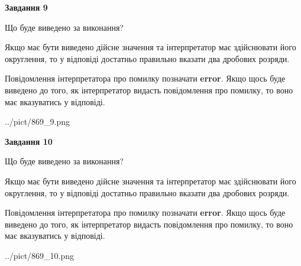 \documentclass[12pt, ukrainian]{article}
\begin{document}
{\begin {Large}
{\begin {center}\textbf{Завдання 9}\end {center}}\par
Що буде виведено за виконання? \par

Якщо має бути виведено дійсне значення та інтерпретатор має здійснювати його округлення, 
то у відповіді достатньо правильно вказати два дробових розряди.

Повідомлення інтерпретатора про помилку позначати \textbf{error}.
Якщо щось буде виведено до того, як інтерпретатор видасть повідомлення про помилку, 
то воно має вказуватись у відповіді. \par

\begin{center}
	{../pict/869_9.png}
\end{center}
\newpage

{\begin {center}\textbf{Завдання 10}\end {center}}\par
Що буде виведено за виконання? \par

Якщо має бути виведено дійсне значення та інтерпретатор має здійснювати його округлення, 
то у відповіді достатньо правильно вказати два дробових розряди.

Повідомлення інтерпретатора про помилку позначати \textbf{error}.
Якщо щось буде виведено до того, як інтерпретатор видасть повідомлення про помилку, 
то воно має вказуватись у відповіді. \par

\begin{center}
	{../pict/869_10.png}
\end{center}
\newpage

\end {Large}}
\end{document}
